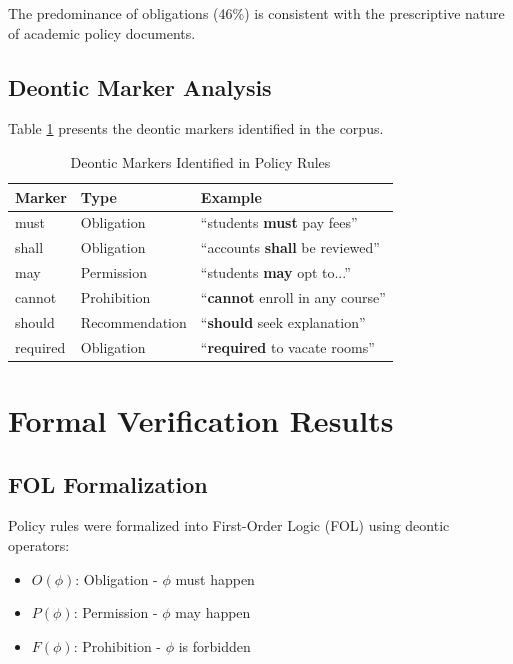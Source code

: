The predominance of obligations (46\%) is consistent with the prescriptive nature of academic policy documents.

\subsection{Deontic Marker Analysis}

Table \ref{tab:deontic-markers} presents the deontic markers identified in the corpus.

\begin{table}[h]
\centering
\caption{Deontic Markers Identified in Policy Rules}
\label{tab:deontic-markers}
\begin{tabular}{|l|l|l|}
\hline
\textbf{Marker} & \textbf{Type} & \textbf{Example} \\
\hline
must & Obligation & ``students \textbf{must} pay fees'' \\
shall & Obligation & ``accounts \textbf{shall} be reviewed'' \\
may & Permission & ``students \textbf{may} opt to...'' \\
cannot & Prohibition & ``\textbf{cannot} enroll in any course'' \\
should & Recommendation & ``\textbf{should} seek explanation'' \\
required & Obligation & ``\textbf{required} to vacate rooms'' \\
\hline
\end{tabular}
\end{table}

\section{Formal Verification Results}

\subsection{FOL Formalization}

Policy rules were formalized into First-Order Logic (FOL) using deontic operators:

\begin{itemize}
    \item $O(\phi)$: Obligation - $\phi$ must happen
    \item $P(\phi)$: Permission - $\phi$ may happen
    \item $F(\phi)$: Prohibition - $\phi$ is forbidden
\end{itemize}

